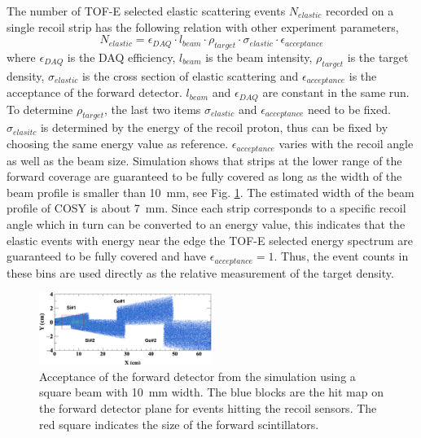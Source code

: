 \documentclass[fleqn,twocolumn,a4paper]{ikpar}
\begin{document}
The number of TOF-E selected elastic scattering events $N_{elastic}$ recorded on a single recoil strip has the
following relation with other experiment parameters,
\begin{equation}
  N_{elastic} = \epsilon_{DAQ}\cdot l_{beam}\cdot\rho_{target}\cdot\sigma_{elastic}\cdot\epsilon_{acceptance}
\end{equation}
where $\epsilon_{DAQ}$ is the DAQ efficiency, $l_{beam}$ is the beam intensity, $\rho_{target}$ is the target density,
$\sigma_{elastic}$ is the cross section of elastic scattering and
$\epsilon_{acceptance}$ is the acceptance of the forward detector.
$l_{beam}$ and $\epsilon_{DAQ}$ are constant in the same run.
To determine $\rho_{target}$, the last two items $\sigma_{elastic}$ and
$\epsilon_{acceptance}$ need to be fixed.
$\sigma_{elasitc}$ is determined by the energy of the recoil proton, thus can be
fixed by choosing the same energy value as reference.
$\epsilon_{acceptance}$ varies with the recoil angle as well as the beam size.
Simulation shows that strips at the lower range of the forward coverage are
guaranteed to be fully covered as long as the width of the beam profile is
smaller than \SI{10}{\mm}, see Fig. \ref{fig:fwd_acceptance}.
The estimated width of the beam profile of COSY is about \SI{7}{\mm}.
Since each strip corresponds to a specific recoil angle which in turn
can be converted to an energy value, this indicates that the elastic events with
energy near the edge the TOF-E selected energy spectrum are guaranteed to be
fully covered and have $\epsilon_{acceptance} = 1$.
Thus, the event counts in these bins are used directly as the relative measurement of the target density.
\begin{figure}[htb!]
  \centering
	\includegraphics[width=0.5\textwidth]{./fwd_acceptance.png}
  \caption{Acceptance of the forward detector from the simulation using a square
    beam with \SI{10}{\mm} width. The blue blocks are the hit map on the forward
    detector plane for events hitting the recoil sensors. The red square indicates
    the size of the forward scintillators.}
  \label{fig:fwd_acceptance}
\end{figure}
\end{document}
